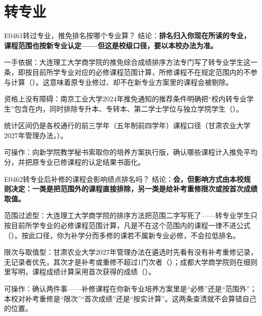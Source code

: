 \section{转专业}
\begin{qa}{E0461}{转过专业，推免排名按哪个专业算？}
结论：\textbf{排名归入你现在所读的专业，课程范围也按新专业认定——但这是校级口径，要以本校办法为准。}

一手依据：大连理工大学商学院的推免综合成绩排序方法专门写了转专业学生这一条，即按目前所学专业对应的必修课程范围计算，所修课程不在规定范围内的不参与计算（）。这意味着原专业修过、却不在新专业方案里的课程会被剔除。

资格上没有障碍：南京工业大学2024年推免通知的推荐条件明确把“校内转专业学生”包含在内，同时排除专升本、专转本、第二学士学位与独立学院学生（）。

统计区间仍是各校通行的前三学年（五年制前四学年）课程口径（甘肃农业大学2027年管理办法，）。

可操作：向新学院教学秘书索取你的培养方案执行版，确认哪些课程计入推免平均分，并把原专业已修课程的认定结果书面化。
\end{qa}

\begin{qa}{E0462}{转专业后补修的课程会影响绩点排名吗？}
结论：\textbf{会，但影响方式由本校规则决定：一类是把范围外的课程直接排除，另一类是给补考重修限次或按首次成绩取值。}

范围过滤型：大连理工大学商学院的排序方法把范围二字写死了——转专业学生只按目前所学专业的必修课程范围计算，凡是不在这个范围内的课程一律不进公式（）。按此口径，你为补学分而多修的课若不属新专业必修，不会拉低排名。

限次与取值型：甘肃农业大学2027年管理办法在遴选时先看有没有补考重修记录，无记录者优先，其次才是补考或重修不超过1门次者（）；成都大学商学院则在细则里写明，课程成绩计算采用首次获得的成绩（）。

可操作：确认两件事——补修课程在你新专业培养方案里是“必修”还是“范围外”；本校对补考重修是“限次”“首次成绩”还是“按实计算”。这两条查清就不会算错自己的位置。
\end{qa}

